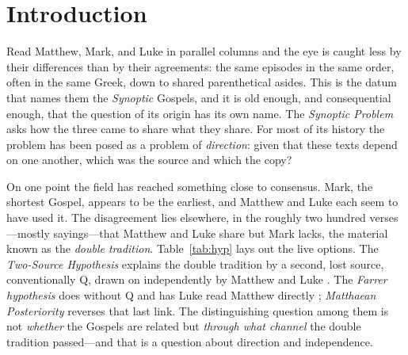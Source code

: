 \documentclass[11pt,letterpaper]{article}
\begin{document}
\section{Introduction}
\label{sec:intro}

Read Matthew, Mark, and Luke in parallel columns and the eye is caught less by their differences than by their agreements: the same episodes in the same order, often in the same Greek, down to shared parenthetical asides. This is the datum that names them the \emph{Synoptic} Gospels, and it is old enough, and consequential enough, that the question of its origin has its own name. The \emph{Synoptic Problem} asks how the three came to share what they share. For most of its history the problem has been posed as a problem of \emph{direction}: given that these texts depend on one another, which was the source and which the copy?

On one point the field has reached something close to consensus. Mark, the shortest Gospel, appears to be the earliest, and Matthew and Luke each seem to have used it. The disagreement lies elsewhere, in the roughly two hundred verses---mostly sayings---that Matthew and Luke share but Mark lacks, the material known as the \emph{double tradition}. Table~\ref{tab:hyp} lays out the live options. The \emph{Two-Source Hypothesis} explains the double tradition by a second, lost source, conventionally Q, drawn on independently by Matthew and Luke \citep{streeter1924,kloppenborg2000}. The \emph{Farrer hypothesis} does without Q and has Luke read Matthew directly \citep{farrer1955,goodacre2002}; \emph{Matthaean Posteriority} reverses that last link. The distinguishing question among them is not \emph{whether} the Gospels are related but \emph{through what channel} the double tradition passed---and that is a question about direction and independence.
\end{document}

